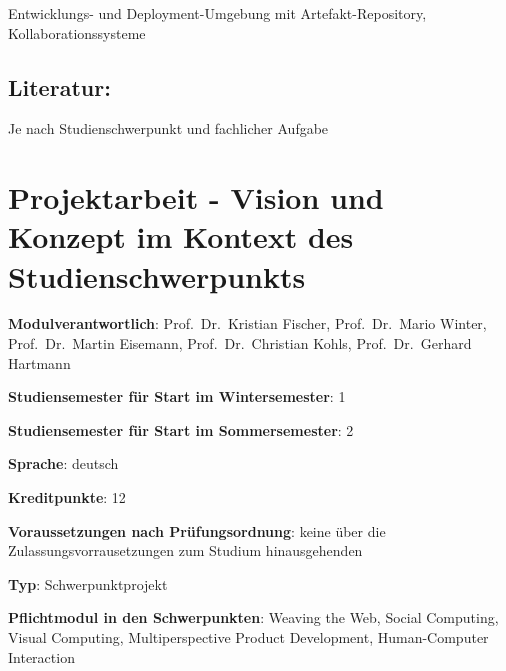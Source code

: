 Entwicklungs- und Deployment-Umgebung mit Artefakt-Repository,
Kollaborationssysteme

\section*{Literatur:\label{/mi-2017/modulbeschreibungen-master/MA_Modul_Projekt_Verwertung}}\label{literaturpathlabelmi-2017modulbeschreibungen-mastermaux5fmodulux5fprojektux5fverwertung}

Je nach Studienschwerpunkt und fachlicher Aufgabe

\chapter{Projektarbeit - Vision und Konzept im Kontext des
Studienschwerpunkts\label{/mi-2017/modulbeschreibungen-master/MA_Modul_Projekt_Vision&Konzept}}\label{projektarbeit---vision-und-konzept-im-kontext-des-studienschwerpunktspathlabelmi-2017modulbeschreibungen-mastermaux5fmodulux5fprojektux5fvisionkonzept}

\begin{modulHead}
\textbf{Modulverantwortlich}: Prof.~Dr.~Kristian
Fischer, Prof.~Dr.~Mario Winter, Prof.~Dr.~Martin Eisemann,
Prof.~Dr.~Christian Kohls, Prof.~Dr.~Gerhard
Hartmann
\end{modulHead}
\begin{modulHead}
\textbf{Studiensemester für
Start im Wintersemester}:
1
\end{modulHead}
\begin{modulHead}
\textbf{Studiensemester für Start
im Sommersemester}:
2
\end{modulHead}
\begin{modulHead}
\textbf{Sprache}:
deutsch
\end{modulHead}
\begin{modulHead}
\textbf{Kreditpunkte}:
12
\end{modulHead}
\begin{modulHead}
\textbf{Voraussetzungen nach
Prüfungsordnung}: keine über die Zulassungsvorrausetzungen zum Studium
hinausgehenden
\end{modulHead}
\begin{modulHead}
\textbf{Typ}:
Schwerpunktprojekt
\end{modulHead}
\begin{modulHead}
\textbf{Pflichtmodul
in den Schwerpunkten}: Weaving the Web, Social Computing, Visual
Computing, Multiperspective Product Development, Human-Computer
Interaction
\end{modulHead}


